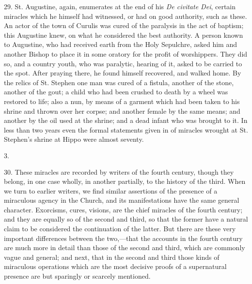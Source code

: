 29.
St. Augustine, again, enumerates at the end of his \emph{De civitate Dei},
certain miracles which he himself had witnessed, or had on good
authority, such as these. An actor of the town of Curulis was cured of
the paralysis in the act of baptism; this Augustine knew, on what he
considered the best authority. A person known to Augustine, who had
received earth from the Holy Sepulchre, asked him and another Bishop
to place it in some oratory for the profit of worshippers. They did
so, and a country youth, who was paralytic, hearing of it, asked to be
carried to the spot. After praying there, he found himself recovered,
and walked home. By the relics of St. Stephen one man was cured
of a fistula, another of the stone, another of the gout; a child who
had been crushed to death by a wheel was restored to life; also a nun,
by means of a garment which had been taken to his shrine and thrown
over her corpse; and another female by the same means; and another by
the oil used at the shrine; and a dead infant who was brought to it.
In less than two years even the formal statements given in of miracles
wrought at St. Stephen's shrine at Hippo were almost seventy.

3.

30.
These miracles are recorded by writers of the fourth century, though
they belong, in one case wholly, in another partially, to the history
of the third. When we turn to earlier writers, we find similar
assertions of the presence of a miraculous agency in the Church, and
its manifestations have the same general character. Exorcisms, cures,
visions, are the chief miracles of the fourth century; and they are
equally so of the second and third, so that the former have a natural
claim to be considered the continuation of the latter. But there are
these very important differences between the two,—that the accounts
in the fourth century are much more in detail than those of the second
and third, which are commonly vague and general; and next, that in the
second and third those kinds of miraculous operations which are the
most decisive proofs of a supernatural presence are but
sparingly or scarcely mentioned.


